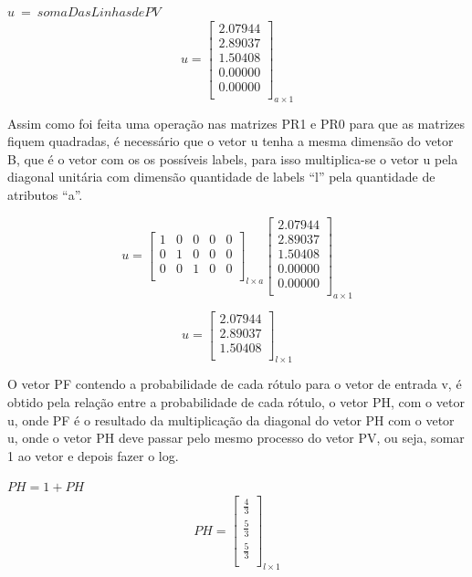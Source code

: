 \begin{center}
$u \ = \ soma Das Linhas de PV$
$$u=\left[
\begin{array}{c}
2.07944 \\
2.89037 \\
1.50408 \\
0.00000 \\
0.00000 \\
\end{array}
\right]_{a \times 1}$$
\end{center}

Assim como foi feita uma operação nas matrizes PR1 e PR0 para que as
matrizes fiquem quadradas, é necessário que o vetor u tenha a mesma
dimensão do vetor B, que é o vetor com os os possíveis labels, para
isso multiplica-se o vetor u pela diagonal unitária com dimensão
quantidade de labels ``l'' pela quantidade de atributos ``a''.

$$u=\left[
\begin{array}{ccccc}
1 & 0 & 0 & 0 & 0 \\
0 & 1 & 0 & 0 & 0 \\
0 & 0 & 1 & 0 & 0 \\
\end{array}
\right]_{l \times a}
\left[
\begin{array}{c}
2.07944 \\
2.89037 \\
1.50408 \\
0.00000 \\
0.00000 \\
\end{array}
\right]_{a \times 1}
$$

$$u=\left[
\begin{array}{c}
2.07944 \\
2.89037 \\
1.50408 \\
\end{array}
\right]_{l \times 1}
$$

O vetor PF contendo a probabilidade de cada rótulo para o vetor de
entrada v, é obtido pela relação entre a probabilidade de cada rótulo,
o vetor PH, com o vetor u, onde PF é o resultado da multiplicação da
diagonal do vetor PH com o vetor u, onde o vetor PH deve passar pelo
mesmo processo do vetor PV, ou seja, somar 1 ao vetor e depois fazer
o log.

\begin{center}
$PH = 1 + PH$
$$PH=\left[
\begin{array}{c}
\frac{4}{3} \\
\frac{5}{3} \\
\frac{5}{3} \\
\end{array}
\right]_{l \times 1}$$
\end{center}

